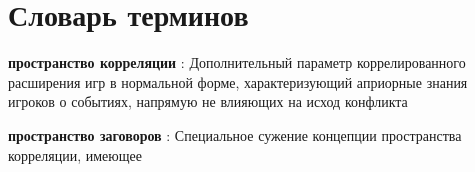 \chapter*{Словарь терминов}             %

\textbf{пространство корреляции} : Дополнительный параметр коррелированного расширения игр в нормальной форме, характеризующий априорные знания игроков о событиях, напрямую не влияющих на исход конфликта

\textbf{пространство заговоров} : Специальное сужение концепции пространства корреляции, имеющее 
